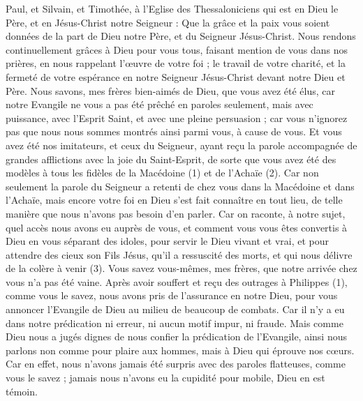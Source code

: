 \BFont
\begin{multicols}{2}
\TextTitle{[Introduction]}
\VerseOne{}Paul, et Silvain, et Timothée, à l'Eglise des Thessaloniciens qui est en Dieu le Père, et en Jésus-Christ notre Seigneur : Que la grâce et la paix vous soient données de la part de Dieu notre Père, et du Seigneur Jésus-Christ.
Nous rendons continuellement grâces à Dieu pour vous tous, faisant mention de vous dans nos prières,
en nous rappelant l’œuvre de votre foi ; le travail de votre charité, et la fermeté de votre espérance en notre Seigneur Jésus-Christ devant notre Dieu et Père.
Nous savons, mes frères bien-aimés de Dieu, que vous avez été élus,
car notre Evangile ne vous a pas été prêché en paroles seulement, mais avec puissance, avec l’Esprit Saint, et avec une pleine persuasion ; car vous n’ignorez pas que nous nous sommes montrés ainsi parmi vous, à cause de vous.
Et vous avez été nos imitateurs, et ceux du Seigneur, ayant reçu la parole accompagnée de grandes afflictions avec la joie du Saint-Esprit,
de sorte que vous avez été des modèles à tous les fidèles de la Macédoine (1) et de l’Achaïe (2).
Car non seulement la parole du Seigneur a retenti de chez vous dans la Macédoine et dans l'Achaïe, mais encore votre foi en Dieu s’est fait connaître en tout lieu, de telle manière que nous n’avons pas besoin d’en parler.
Car on raconte, à notre sujet, quel accès nous avons eu auprès de vous, et comment vous vous êtes convertis à Dieu en vous séparant des idoles, pour servir le Dieu vivant et vrai,
et pour attendre des cieux son Fils Jésus, qu'il a ressuscité des morts, et qui nous délivre de la colère à venir (3).
\VerseOne{}Vous savez vous-mêmes, mes frères, que notre arrivée chez vous n'a pas été vaine.
Après avoir souffert et reçu des outrages à Philippes (1), comme vous le savez, nous avons pris de l’assurance en notre Dieu, pour vous annoncer l’Evangile de Dieu au milieu de beaucoup de combats.
Car il n’y a eu dans notre prédication ni erreur, ni aucun motif impur, ni fraude.
Mais comme Dieu nous a jugés dignes de nous confier la prédication de l'Evangile, ainsi nous parlons non comme pour plaire aux hommes, mais à Dieu qui éprouve nos cœurs.
Car en effet, nous n’avons jamais été surpris avec des paroles flatteuses, comme vous le savez ; jamais nous n’avons eu la cupidité pour mobile, Dieu en est témoin.

\end{multicols}

